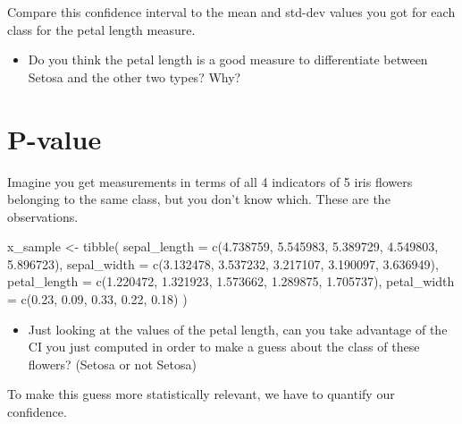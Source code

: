 \documentclass[
  oneside]{book}
\newenvironment{Shaded}{\begin{snugshade}}{\end{snugshade}}
\newcommand{\AttributeTok}[1]{\textcolor[rgb]{0.77,0.63,0.00}{#1}}
\newcommand{\FloatTok}[1]{\textcolor[rgb]{0.00,0.00,0.81}{#1}}
\newcommand{\FunctionTok}[1]{\textcolor[rgb]{0.00,0.00,0.00}{#1}}
\newcommand{\NormalTok}[1]{#1}
\newcommand{\OtherTok}[1]{\textcolor[rgb]{0.56,0.35,0.01}{#1}}
\providecommand{\tightlist}{%
  \setlength{\itemsep}{0pt}\setlength{\parskip}{0pt}}
\begin{document}
Compare this confidence interval to the mean and std-dev
values you got for each class for the petal length measure.

\begin{itemize}
\tightlist
\item
  Do you think the petal length is a good measure to
  differentiate between Setosa and the other two types? Why?
\end{itemize}

\hypertarget{p-value-1}{%
\section{P-value}\label{p-value-1}}

Imagine you get measurements in terms of all 4 indicators of
5 iris flowers belonging to the same class, but you don't know
which. These are the observations.

\begin{Shaded}
\begin{Highlighting}[]
\NormalTok{x\_sample }\OtherTok{\textless{}{-}} \FunctionTok{tibble}\NormalTok{(}
  \AttributeTok{sepal\_length =} \FunctionTok{c}\NormalTok{(}\FloatTok{4.738759}\NormalTok{, }\FloatTok{5.545983}\NormalTok{, }\FloatTok{5.389729}\NormalTok{, }\FloatTok{4.549803}\NormalTok{, }\FloatTok{5.896723}\NormalTok{),}
  \AttributeTok{sepal\_width =} \FunctionTok{c}\NormalTok{(}\FloatTok{3.132478}\NormalTok{, }\FloatTok{3.537232}\NormalTok{, }\FloatTok{3.217107}\NormalTok{, }\FloatTok{3.190097}\NormalTok{, }\FloatTok{3.636949}\NormalTok{),}
  \AttributeTok{petal\_length =} \FunctionTok{c}\NormalTok{(}\FloatTok{1.220472}\NormalTok{, }\FloatTok{1.321923}\NormalTok{, }\FloatTok{1.573662}\NormalTok{, }\FloatTok{1.289875}\NormalTok{, }\FloatTok{1.705737}\NormalTok{),}
  \AttributeTok{petal\_width =} \FunctionTok{c}\NormalTok{(}\FloatTok{0.23}\NormalTok{, }\FloatTok{0.09}\NormalTok{, }\FloatTok{0.33}\NormalTok{, }\FloatTok{0.22}\NormalTok{, }\FloatTok{0.18}\NormalTok{)}
\NormalTok{)}
\end{Highlighting}
\end{Shaded}

\begin{itemize}
\tightlist
\item
  Just looking at the values of the petal length,
  can you take advantage of the CI you just computed
  in order to make a guess about the class of these flowers?
  (Setosa or not Setosa)
\end{itemize}

To make this guess more statistically relevant, we have
to quantify our confidence.
\end{document}
